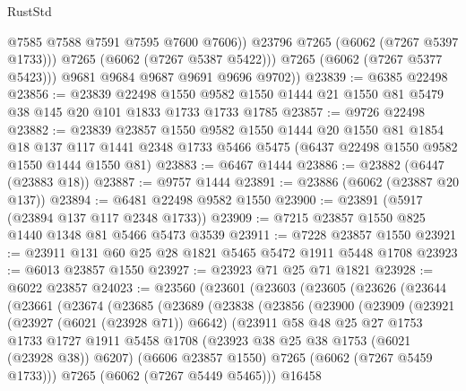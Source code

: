 \begin{lexlean}{RustStd}
\begin{coremodule}
                  @7585
                  @7588
                  @7591
                  @7595
                  @7600
                  @7606))
              @23796
              @7265
              (@6062 (@7267 @5397 @1733)))
            @7265
            (@6062 (@7267 @5387 @5422)))
          @7265
          (@6062 (@7267 @5377 @5423)))
        @9681
        @9684
        @9687
        @9691
        @9696
        @9702))
@23839 := @6385 @22498
@23856 := @23839
    @22498
    @1550
    @9582
    @1550
    @1444
    @21
    @1550
    @81
    @5479
    @38
    @145
    @20
    @101
    @1833
    @1733
    @1733
    @1785
@23857 := @9726 @22498
@23882 := @23839
    @23857
    @1550
    @9582
    @1550
    @1444
    @20
    @1550
    @81
    @1854
    @18
    @137
    @117
    @1441
    @2348
    @1733
    @5466
    @5475
    (@6437 @22498 @1550 @9582 @1550 @1444 @1550 @81)
@23883 := @6467 @1444
@23886 := @23882 (@6447 (@23883 @18))
@23887 := @9757 @1444
@23891 := @23886 (@6062 (@23887 @20 @137))
@23894 := @6481 @22498 @9582 @1550
@23900 := @23891 (@5917 (@23894 @137 @117 @2348 @1733))
@23909 := @7215 @23857 @1550 @825 @1440 @1348 @81 @5466 @5473 @3539
@23911 := @7228 @23857 @1550
@23921 := @23911 @131 @60 @25 @28 @1821 @5465 @5472 @1911 @5448 @1708
@23923 := @6013 @23857 @1550
@23927 := @23923 @71 @25 @71 @1821
@23928 := @6022 @23857
@24023 := @23560
    (@23601
      (@23603
        (@23605
          (@23626
            (@23644
              (@23661
                (@23674
                  (@23685
                    (@23689
                      (@23838
                        (@23856
                          (@23900
                            (@23909
                              (@23921
                                (@23927 (@6021 (@23928 @71)) @6642)
                                (@23911
                                  @58
                                  @48
                                  @25
                                  @27
                                  @1753
                                  @1733
                                  @1727
                                  @1911
                                  @5458
                                  @1708
                                  (@23923 @38 @25 @38 @1753 (@6021 (@23928 @38)) @6207)
                                  (@6606 @23857 @1550)
                                  @7265
                                  (@6062 (@7267 @5459 @1733)))
                                @7265
                                (@6062 (@7267 @5449 @5465)))
                              @16458

\end{coremodule}
\end{lexlean}
